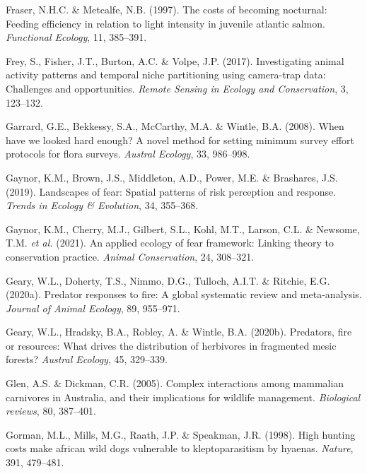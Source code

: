 \documentclass[11pt,a4paper,titlepage,twoside,openright]{style/unimelbthesis}
\begin{document}
\begin{mainmatter}
\leavevmode\hypertarget{ref-fraser1997costs}{}%
Fraser, N.H.C. \& Metcalfe, N.B. (1997). The costs of becoming nocturnal: Feeding efficiency in relation to light intensity in juvenile atlantic salmon. \emph{Functional Ecology}, 11, 385--391.

\leavevmode\hypertarget{ref-frey2017investigating}{}%
Frey, S., Fisher, J.T., Burton, A.C. \& Volpe, J.P. (2017). Investigating animal activity patterns and temporal niche partitioning using camera-trap data: Challenges and opportunities. \emph{Remote Sensing in Ecology and Conservation}, 3, 123--132.

\leavevmode\hypertarget{ref-garrard2008when}{}%
Garrard, G.E., Bekkessy, S.A., McCarthy, M.A. \& Wintle, B.A. (2008). When have we looked hard enough? A novel method for setting minimum survey effort protocols for flora surveys. \emph{Austral Ecology}, 33, 986--998.

\leavevmode\hypertarget{ref-gaynor2019landscapes}{}%
Gaynor, K.M., Brown, J.S., Middleton, A.D., Power, M.E. \& Brashares, J.S. (2019). Landscapes of fear: Spatial patterns of risk perception and response. \emph{Trends in Ecology \& Evolution}, 34, 355--368.

\leavevmode\hypertarget{ref-gaynor2021applied}{}%
Gaynor, K.M., Cherry, M.J., Gilbert, S.L., Kohl, M.T., Larson, C.L. \& Newsome, T.M. \emph{et al.} (2021). An applied ecology of fear framework: Linking theory to conservation practice. \emph{Animal Conservation}, 24, 308--321.

\leavevmode\hypertarget{ref-geary2020predator}{}%
Geary, W.L., Doherty, T.S., Nimmo, D.G., Tulloch, A.I.T. \& Ritchie, E.G. (2020a). Predator responses to fire: A global systematic review and meta-analysis. \emph{Journal of Animal Ecology}, 89, 955--971.

\leavevmode\hypertarget{ref-geary2020predators}{}%
Geary, W.L., Hradsky, B.A., Robley, A. \& Wintle, B.A. (2020b). Predators, fire or resources: What drives the distribution of herbivores in fragmented mesic forests? \emph{Austral Ecology}, 45, 329--339.

\leavevmode\hypertarget{ref-glen2005complex}{}%
Glen, A.S. \& Dickman, C.R. (2005). Complex interactions among mammalian carnivores in Australia, and their implications for wildlife management. \emph{Biological reviews}, 80, 387--401.

\leavevmode\hypertarget{ref-gorman1998high}{}%
Gorman, M.L., Mills, M.G., Raath, J.P. \& Speakman, J.R. (1998). High hunting costs make african wild dogs vulnerable to kleptoparasitism by hyaenas. \emph{Nature}, 391, 479--481.


\end{mainmatter}
\end{document}
